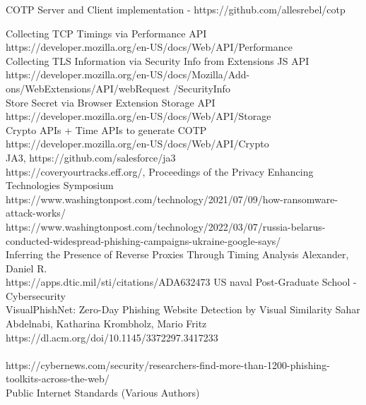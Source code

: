 \documentclass[a4paper, 11pt]{article} 				%
\begin{document}
\noindent
[9]COTP Server and Client implementation - https://github.com/allesrebel/cotp

\noindent
[10]Collecting TCP Timings via Performance API\\
https://developer.mozilla.org/en-US/docs/Web/API/Performance\\

\noindent
[11]Collecting TLS Information via Security Info from Extensions JS API\\
https://developer.mozilla.org/en-US/docs/Mozilla/Add-ons/WebExtensions/API/webRequest /SecurityInfo\\

\noindent
[12]Store Secret via Browser Extension Storage API\\
https://developer.mozilla.org/en-US/docs/Web/API/Storage\\

\noindent
[13]Crypto APIs + Time APIs to generate COTP\\
https://developer.mozilla.org/en-US/docs/Web/API/Crypto\\


\noindent
[14]JA3, https://github.com/salesforce/ja3\\

\noindent
[15]https://coveryourtracks.eff.org/, Proceedings of the Privacy Enhancing Technologies Symposium\\

\noindent
[16]https://www.washingtonpost.com/technology/2021/07/09/how-ransomware-attack-works/\\

\noindent
[17]https://www.washingtonpost.com/technology/2022/03/07/russia-belarus-conducted-widespread-phishing-campaigns-ukraine-google-says/\\

\noindent
[18]Inferring the Presence of Reverse Proxies Through Timing Analysis Alexander, Daniel R.\\
https://apps.dtic.mil/sti/citations/ADA632473 US naval Post-Graduate School - Cybersecurity\\

\noindent
[19]VisualPhishNet: Zero-Day Phishing Website Detection by Visual Similarity Sahar Abdelnabi, Katharina Krombholz, Mario Fritz\\
https://dl.acm.org/doi/10.1145/3372297.3417233\\

\\
https://cybernews.com/security/researchers-find-more-than-1200-phishing-toolkits-across-the-web/\\

\noindent
[-]Public Internet Standards (Various Authors)\\
\end{document}
